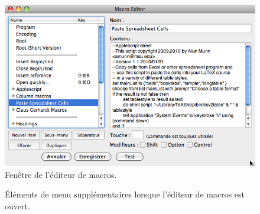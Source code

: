 \documentclass[11pt,french]{article}
\newcommand{\TS}{\textsf{\TeX Shop}}
\newcommand{\mnu}[1]{\textsf{#1}}
\newcommand{\To}{\,\(\to\)\,}
\begin{document}
%
\begin{figure}
\includegraphics[width=4.75in]{figs/editeurmacros}
\caption{Fenêtre de l'éditeur de macros.}
\label{MacroEditorWindow}
\end{figure}
%

\begin{figure}
\centering
{}
\caption{Éléments de menu supplémentaires lorsque l'éditeur de macros est ouvert.\label{MacrosMenu}}
\end{figure}
\end{document}
